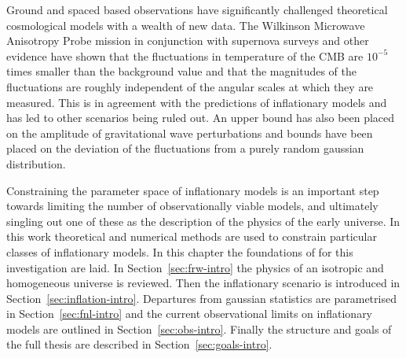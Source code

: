 Ground and spaced based observations have significantly challenged theoretical
cosmological models with a wealth of new data. The Wilkinson Microwave
Anisotropy Probe mission \cite{Komatsu:2008hk} in conjunction with supernova
surveys and other evidence have shown that the fluctuations in
temperature of the CMB are $10^{-5}$ times smaller than the background value
and that the magnitudes of the fluctuations are roughly independent of the
angular scales at which they are measured. This is in agreement with the
predictions of inflationary models and has led to other scenarios being ruled
out. An upper bound has also been placed
on the amplitude of gravitational wave perturbations and bounds have been
placed on the deviation of the fluctuations from a purely random gaussian
distribution.

Constraining the parameter space of inflationary models is an important step
towards limiting the number of observationally viable models, and ultimately
singling out one of these as the description of the physics of the early
universe. In this work theoretical and numerical methods are used to constrain
particular classes of inflationary models. In this chapter the foundations of
for this investigation are laid. In Section~\ref{sec:frw-intro} the physics of
an isotropic and homogeneous universe is reviewed. Then the inflationary
scenario is introduced in Section~\ref{sec:inflation-intro}. Departures from
gaussian statistics are parametrised in Section~\ref{sec:fnl-intro} and the
current observational limits on inflationary models are outlined in
Section~\ref{sec:obs-intro}. Finally the structure and goals of the full thesis
are described in Section~\ref{sec:goals-intro}.



